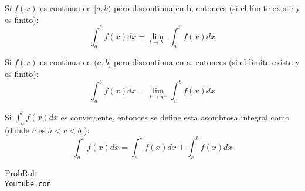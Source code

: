 \documentclass[12pt]{article}							    %
\begin{document}
Si $f(x)$ es continua en $[a, b)$  pero discontinua en b, entonces (si el límite existe y es finito):
\begin{equation}
    \int_a^b f(x) dx = \lim_{t \to b^-} \int_a^t f(x) dx
\end{equation}

Si $f(x)$ es continua en $(a, b]$  pero discontinua en a, entonces (si el límite existe y es finito):
\begin{equation}
    \int_a^b f(x) dx = \lim_{t \to a^+} \int_t^b f(x) dx
\end{equation}



Si $\int_a^bf(x)dx$ es convergente, entonces se define esta asombrosa integral como (donde $c$ es $a<c<b$ ):
\begin{equation}
    \int_a^b f(x) dx = \int_a^c f(x) dx + \int_c^b f(x) dx  
\end{equation}



\clearpage

	\begin{thebibliography}{9}

		ProbRob
		\\\texttt{Youtube.com}


	 

\end{thebibliography}
\end{document}
